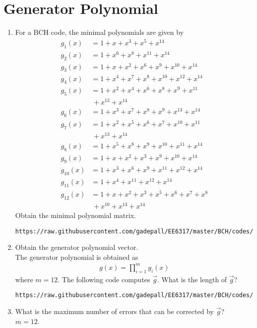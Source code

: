 \documentclass[journal,12pt,twocolumn]{IEEEtran}
\renewcommand\thesection{\arabic{section}}
\begin{document}
\section{Generator Polynomial}
\begin{enumerate}[label=\thesection.\arabic*
,ref=\thesection.\theenumi]
\item For a BCH code, the minimal polynomials are given by 
\begin{align}
g_1(x)&=1+x+x^3+x^5+x^{14}\\
g_2(x)&=1+x^6+x^8+x^{11}+x^{14}\\
g_3(x)&=1+x+x^2+x^6+x^9+x^{10}+x^{14}\\
g_4(x)&=1+x^4+x^7+x^8+x^10+x^{12}+x^{14}\\
g_5(x)&=1+x^2+x^4+x^6+x^8+x^9+x^{11}
\nonumber \\
&\,+x^{13}+x^{14}\\
g_6(x)&=1+x^3+x^7+x^8+x^9+x^{13}+x^{14}\\
g_7(x)&=1+x^2+x^5+x^6+x^7+x^{10}+x^{11}
\nonumber \\
&\,+x^{13}+x^{14}\\
g_8(x)&=1+x^5+x^8+x^9+x^{10}+x^{11}+x^{14}\\
g_9(x)&=1+x+x^2+x^3+x^9+x^{10}+x^{14}\\
g_{10}(x)&=1+x^3+x^6+x^9+x^{11}+x^{12}+x^{14}\\
g_{11}(x)&=1+x^4+x^{11}+x^{12}+x^{14}\\
g_{12}(x)&=1+x+x^2+x^3+x^5+x^6+x^7+x^8
\nonumber \\
&\,+x^{10}+x^{13}+x^{14}
\end{align}
Obtain the minimal polynomial matrix.
\\
\solution
\begin{lstlisting}
https://raw.githubusercontent.com/gadepall/EE6317/master/BCH/codes/min_poly_mat.py
\end{lstlisting}
\item Obtain the generator polynomial vector.
\\
\solution The generator polynomial is obtained as
\begin{align}
g(x) =\prod_{i = 1}^{m}g_i(x)
\end{align}
%
where $m=12$.
The following code computes $\vec{g}$. What is the length of $\vec{g}$?
\begin{lstlisting}
https://raw.githubusercontent.com/gadepall/EE6317/master/BCH/codes/gen_poly.py
\end{lstlisting}
\item What is the maximum number of errors that can be corrected by $\vec{g}$?
\\
\solution $m = 12$.
\end{enumerate}
\end{document}
